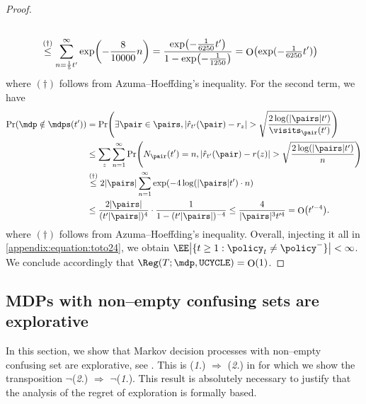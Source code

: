 \documentclass[preprint,cleveref,12pt]{colt2025}
\DeclarePairedDelimiter{\braces}{\{}{\}}	%
\DeclarePairedDelimiter{\parens}{(}{)}	%
\DeclarePairedDelimiter{\abs}{\lvert}{\rvert}	%
\DeclareMathOperator*{\OH}{\mathrm{O}}
\def\model{\mdp}
\def\models{\mdps}
\begin{document}
\begin{proof}
\begin{align*}
{            } \\
            & \overset{(\dagger)}\le 
            \sum_{n=\frac15t'}^\infty 
            \exp\parens*{
                -\frac 8{10000}n 
            } = \frac{\exp\parens*{-\frac 1{6250}t'}}{1 - \exp\parens*{-\frac 1{1250}}} = \OH\parens*{\exp(-\tfrac 1{6250} t')}
        \end{align*}
        where $(\dagger)$ follows from Azuma--Hoeffding's inequality.
        For the second term, we have 
        \begin{align*}
            \Pr\parens*{\model \notin \models(t')}
            & = \Pr \parens*{
                \exists \pair \in \pairs, 
                \abs*{\hat r_{t'}(\pair) - r_z} > \sqrt{\frac{2\log(\abs{\pairs}t')}{\visits_\pair(t')}}
            }
            \\
            & \le 
            \sum_z 
            \sum_{n=1}^\infty 
            \Pr \parens*{
                N_{\pair}(t') = n, 
                \abs*{\hat r_{t'}(\pair) - r(z)} > \sqrt{\frac{2\log(\abs{\pairs}t')}{n}}
            } \\
            & \overset{(\dagger)}\le 2\abs{\pairs} \sum_{n=1}^\infty \exp\parens*{-4\log(\abs{\pairs}t') \cdot n}
            \\
            & \le \frac{2\abs{\pairs}}{(t'\abs{\pairs})^4} \cdot \frac 1{1 - (t'\abs{\pairs})^{-4}} \le \frac 4{\abs{\pairs}^3t'^4} = \OH\parens*{t'^{-4}}. 
        \end{align*}
        where $(\dagger)$ follows from Azuma--Hoeffding's inequality. 
        Overall, injecting it all in \eqref{appendix:equation:toto24}, we obtain $\EE\abs*{\braces{t \ge 1 : \policy_t \ne \policy^-}} < \infty$. 
        We conclude accordingly that $\Reg(T; \model, \texttt{UCYCLE}) = \OH(1)$. 
    \end{proof}
    \def\proofname{Proof}


    \subsection{MDPs with non--empty confusing sets are explorative}
    \label{appendix_confusing_implies_explorative}

    In this section, we show that Markov decision processes with non--empty confusing set are explorative, see .
    This is (\textit{1.}) $\Rightarrow$ (\textit{2.}) in  for which we show the transposition $\neg$(\textit{2.}) $\Rightarrow$ $\neg$(\textit{1.}).
    This result is absolutely necessary to justify that the analysis of the regret of exploration is formally based. 
\end{document}
